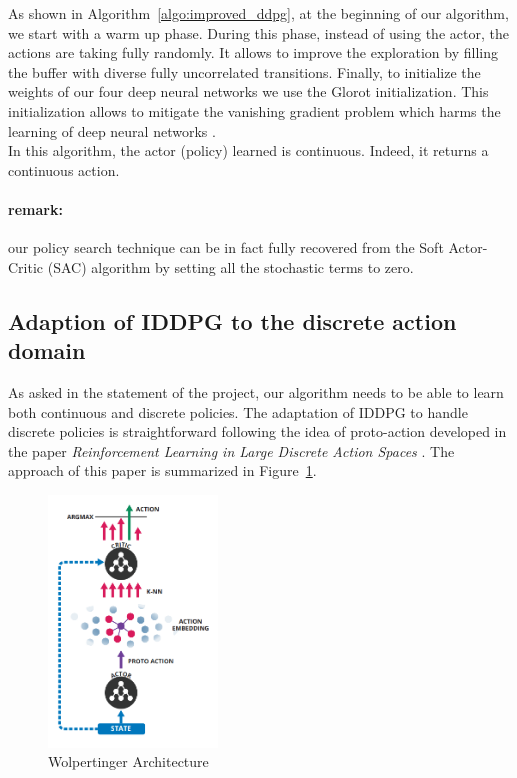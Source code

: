As shown in Algorithm~\ref{algo:improved_ddpg}, at the beginning of our algorithm, we start with a warm up phase. During this phase, instead of using the actor, the actions are taking fully randomly. It allows to improve the exploration by filling the buffer with diverse fully uncorrelated transitions. 
Finally, to initialize the weights of our four deep neural networks we use the Glorot initialization. This initialization allows to mitigate the vanishing gradient problem which harms the learning of deep neural networks \cite{init}. \\

In this algorithm, the actor (policy) learned is continuous. Indeed, it returns a continuous action.      

\paragraph{remark: } our policy search technique can be in fact fully recovered from the Soft Actor-Critic (SAC) algorithm \cite{sac} by setting all the stochastic terms to zero.

\subsection{Adaption of IDDPG to the discrete action domain}

As asked in the statement of the project, our algorithm needs to be able to learn both continuous and discrete policies. The adaptation of IDDPG to handle discrete policies is straightforward following the idea of proto-action developed in the paper \textit{Reinforcement Learning in Large Discrete Action Spaces} \cite{protoAction}. The approach of this paper is summarized in Figure~\ref{fig:Wolpertinger_Architecture}.

\begin{figure}[H]
    \centering
    \includegraphics[width=0.4\textwidth]{figures/protoAction.png}
    \caption{Wolpertinger Architecture \cite{protoAction}}
    \label{fig:Wolpertinger_Architecture}
\end{figure}

